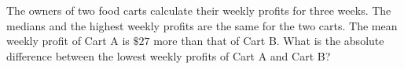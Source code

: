 The owners of two food carts calculate their weekly profits for three weeks. The medians and the highest weekly profits are the same for the two carts. The mean weekly profit of Cart A is $\$27$ more than that of Cart B. What is the absolute difference between the lowest weekly profits of Cart A and Cart B?
